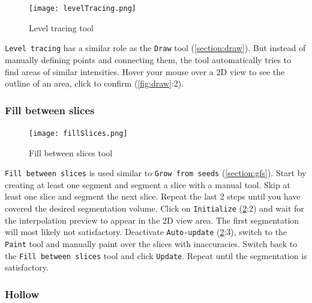 \begin{figure}[h!]
	\centerline{
		\texttt{[image: levelTracing.png]}}
	\caption{Level tracing tool}\label{fig:lT}
\end{figure}
\noindent
\texttt{Level tracing} has a similar role as the \texttt{Draw} tool (\cref{section:draw}).
But instead of manually defining points and connecting them, the tool automatically tries to find areas of similar intensities.
Hover your mouse over a 2D view to see the outline of an area, click to confirm (\cref{fig:draw}:2).

\pagebreak
\subsubsection{Fill between slices}
\begin{figure}[h]
	\begin{subfigure}{0.2\textwidth}
		
	\end{subfigure}
	\begin{subfigure}{0.2\textwidth}
		
	\end{subfigure}
\end{figure}

\begin{figure}[h!]
	\centerline{
		\texttt{[image: fillSlices.png]}}
	\caption{Fill between slices tool}\label{fig:fS}
\end{figure}
\noindent
\texttt{Fill between slices} is used similar to \texttt{Grow from seeds} (\cref{section:gfs}).
Start by creating at least one segment and segment a slice with a manual tool.
Skip at least one slice and segment the next slice.
Repeat the last 2 steps until you have covered the desired segmentation volume.
Click on \texttt{Initialize} (\cref{fig:fS}:2) and wait for the interpolation preview to appear in the 2D view area.
The first segmentation will most likely not satisfactory.
Deactivate \texttt{Auto-update} (\cref{fig:fS}:3), switch to the \texttt{Paint} tool and manually paint over the slices with inaccuracies.
Switch back to the \texttt{Fill between slices} tool and click \texttt{Update}.
Repeat until the segmentation is satisfactory.

\pagebreak
\subsubsection{Hollow}
\begin{figure}[h]
	\begin{subfigure}{0.2\textwidth}
		
	\end{subfigure}
\end{figure}


